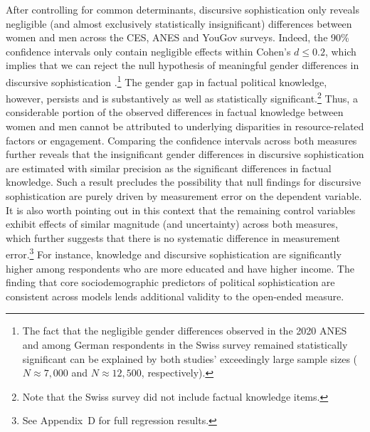 After controlling for common determinants, discursive sophistication only reveals negligible (and almost exclusively statistically insignificant) differences between women and men across the CES, ANES and YouGov surveys. Indeed, the 90\% confidence intervals only contain negligible effects within Cohen's $d \leq 0.2$, which implies that we can reject the null hypothesis of meaningful gender differences in discursive sophistication \citep{rainey2014arguing}.\footnote{The fact that the negligible gender differences observed in the 2020 ANES and among German respondents in the Swiss survey remained statistically significant can be explained by both studies' exceedingly large sample sizes ($N\approx 7,000$ and $N\approx 12,500$, respectively).} The gender gap in factual political knowledge, however, persists and is substantively as well as statistically significant.\footnote{Note that the Swiss survey did not include factual knowledge items.} Thus, a considerable portion of the observed differences in factual knowledge between women and men cannot be attributed to underlying disparities in resource-related factors or engagement. Comparing the confidence intervals across both measures further reveals that the insignificant gender differences in discursive sophistication are estimated with similar precision as the significant differences in factual knowledge. Such a result precludes the possibility that null findings for discursive sophistication are purely driven by measurement error on the dependent variable. It is also worth pointing out in this context that the remaining control variables exhibit effects of similar magnitude (and uncertainty) across both measures, which further suggests that there is no systematic difference in measurement error.\footnote{See Appendix~D for full regression results.} For instance, knowledge and discursive sophistication are significantly higher among respondents who are more educated and have higher income. The finding that core sociodemographic predictors of political sophistication are consistent across models lends additional validity to the open-ended measure.

